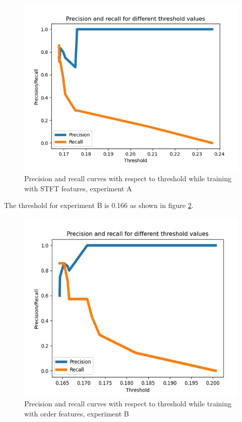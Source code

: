 \documentclass[conference]{IEEEtran}
\begin{document}
\begin{figure}[htbp]
\centerline{\includegraphics[scale=0.5]{stft_threshold.png}}
\caption{Precision and recall curves with respect to threshold while training with STFT features, experiment A}
\label{fig:threshold_expa}
\end{figure}

 The threshold for experiment B is 0.166 as shown in figure \ref{fig:threshold_expb}.

\begin{figure}[htbp]
\centerline{\includegraphics[scale=0.5]{order_threshold.png}}
\caption{Precision and recall curves with respect to threshold while training with order features, experiment B}
\label{fig:threshold_expb}
\end{figure}
\end{document}
